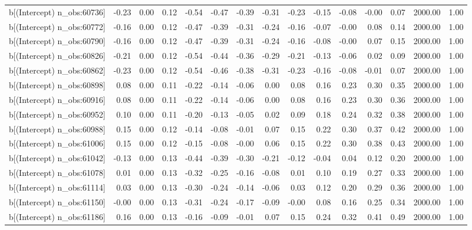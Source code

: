 \begin{table}[ht]
\begin{tabular}{rrrrrrrrrrrrrrr}
  b[(Intercept) n\_obs:60736] & -0.23 & 0.00 & 0.12 & -0.54 & -0.47 & -0.39 & -0.31 & -0.23 & -0.15 & -0.08 & -0.00 & 0.07 & 2000.00 & 1.00 \\ 
  b[(Intercept) n\_obs:60772] & -0.16 & 0.00 & 0.12 & -0.47 & -0.39 & -0.31 & -0.24 & -0.16 & -0.07 & -0.00 & 0.08 & 0.14 & 2000.00 & 1.00 \\ 
  b[(Intercept) n\_obs:60790] & -0.16 & 0.00 & 0.12 & -0.47 & -0.39 & -0.31 & -0.24 & -0.16 & -0.08 & -0.00 & 0.07 & 0.15 & 2000.00 & 1.00 \\ 
  b[(Intercept) n\_obs:60826] & -0.21 & 0.00 & 0.12 & -0.54 & -0.44 & -0.36 & -0.29 & -0.21 & -0.13 & -0.06 & 0.02 & 0.09 & 2000.00 & 1.00 \\ 
  b[(Intercept) n\_obs:60862] & -0.23 & 0.00 & 0.12 & -0.54 & -0.46 & -0.38 & -0.31 & -0.23 & -0.16 & -0.08 & -0.01 & 0.07 & 2000.00 & 1.00 \\ 
  b[(Intercept) n\_obs:60898] & 0.08 & 0.00 & 0.11 & -0.22 & -0.14 & -0.06 & 0.00 & 0.08 & 0.16 & 0.23 & 0.30 & 0.35 & 2000.00 & 1.00 \\ 
  b[(Intercept) n\_obs:60916] & 0.08 & 0.00 & 0.11 & -0.22 & -0.14 & -0.06 & 0.00 & 0.08 & 0.16 & 0.23 & 0.30 & 0.36 & 2000.00 & 1.00 \\ 
  b[(Intercept) n\_obs:60952] & 0.10 & 0.00 & 0.11 & -0.20 & -0.13 & -0.05 & 0.02 & 0.09 & 0.18 & 0.24 & 0.32 & 0.38 & 2000.00 & 1.00 \\ 
  b[(Intercept) n\_obs:60988] & 0.15 & 0.00 & 0.12 & -0.14 & -0.08 & -0.01 & 0.07 & 0.15 & 0.22 & 0.30 & 0.37 & 0.42 & 2000.00 & 1.00 \\ 
  b[(Intercept) n\_obs:61006] & 0.15 & 0.00 & 0.12 & -0.15 & -0.08 & -0.00 & 0.06 & 0.15 & 0.22 & 0.30 & 0.38 & 0.43 & 2000.00 & 1.00 \\ 
  b[(Intercept) n\_obs:61042] & -0.13 & 0.00 & 0.13 & -0.44 & -0.39 & -0.30 & -0.21 & -0.12 & -0.04 & 0.04 & 0.12 & 0.20 & 2000.00 & 1.00 \\ 
  b[(Intercept) n\_obs:61078] & 0.01 & 0.00 & 0.13 & -0.32 & -0.25 & -0.16 & -0.08 & 0.01 & 0.10 & 0.19 & 0.27 & 0.33 & 2000.00 & 1.00 \\ 
  b[(Intercept) n\_obs:61114] & 0.03 & 0.00 & 0.13 & -0.30 & -0.24 & -0.14 & -0.06 & 0.03 & 0.12 & 0.20 & 0.29 & 0.36 & 2000.00 & 1.00 \\ 
  b[(Intercept) n\_obs:61150] & -0.00 & 0.00 & 0.13 & -0.31 & -0.24 & -0.17 & -0.09 & -0.00 & 0.08 & 0.16 & 0.25 & 0.34 & 2000.00 & 1.00 \\ 
  b[(Intercept) n\_obs:61186] & 0.16 & 0.00 & 0.13 & -0.16 & -0.09 & -0.01 & 0.07 & 0.15 & 0.24 & 0.32 & 0.41 & 0.49 & 2000.00 & 1.00 \\ 

\end{tabular}
\end{table}
